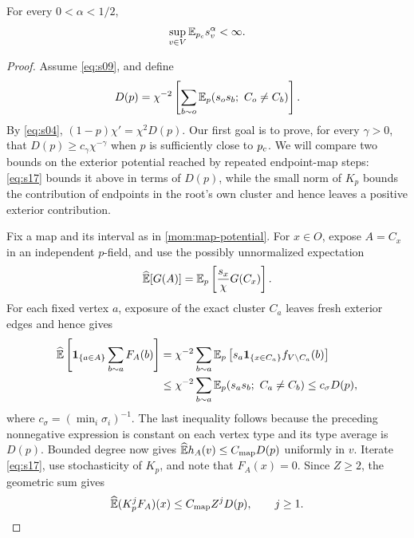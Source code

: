 \begin{proposition}
\label{mom:critical-moments}
For every $0<\alpha<1/2$,
\begin{equation}
 \sup_{v\in V}\mathbb E_{{p_c}}s_v^\alpha<\infty.
 \label{eq:s21}
\end{equation}
\end{proposition}

\begin{proof}
Assume \eqref{eq:s09}, and define
\[
 D(p)=\chi^{-2}\left[
       \sum_{b\sim o}\mathbb E_p(s_os_b;\ C_o\ne C_b)\right].
\]
By \eqref{eq:s04}, $(1-p)\chi'=\chi^2D(p)$.  Our first goal is to
prove, for every $\gamma>0$, that $D(p)\ge c_\gamma\chi^{-\gamma}$
when $p$ is sufficiently close to ${p_c}$.  We will compare two bounds
on the exterior potential reached by repeated endpoint-map steps:
\eqref{eq:s17} bounds it above in terms of $D(p)$, while the small
norm of $K_p$ bounds the contribution of endpoints in the root's
own cluster and hence leaves a positive exterior contribution.

Fix a map and its interval as in \cref{mom:map-potential}.  For
$x\in O$, expose $A=C_x$ in an independent $p$-field, and use the
possibly unnormalized expectation
\[
 \widehat{\mathbb E}[G(A)]=\mathbb E_p\left[\frac{s_x}{\chi}G(C_x)\right].
\]
For each fixed vertex $a$, exposure of the exact cluster $C_a$
leaves fresh exterior edges and hence gives
\begin{align*}
 \widehat{\mathbb E}\left[\mathbf 1_{\{a\in A\}}
                         \sum_{b\sim a}F_A(b)\right]
 &=\chi^{-2}\sum_{b\sim a}
      \mathbb E_p\left[s_a\mathbf 1_{\{x\in C_a\}}f_{V\setminus C_a}(b)\right]
 \\
 &\le \chi^{-2}\sum_{b\sim a}
                 \mathbb E_p(s_as_b;\ C_a\ne C_b)
 \le c_\sigma D(p),
\end{align*}
where $c_\sigma=(\min_i\sigma_i)^{-1}$.  The last inequality follows
because the preceding nonnegative expression is constant on each
vertex type and its type average is $D(p)$.  Bounded degree now gives
$\widehat{\mathbb E} h_A(v)\le C_{\mathrm{map}}D(p)$ uniformly in $v$.
Iterate \eqref{eq:s17}, use stochasticity of $K_p$, and note that
$F_A(x)=0$.  Since $Z\ge2$, the geometric sum gives
\begin{equation}
 \widehat{\mathbb E}(K_p^jF_A)(x)
       \le C_{\mathrm{map}} Z^jD(p),\qquad j\ge1.
 \label{eq:s18}
\end{equation}


\end{proof}
